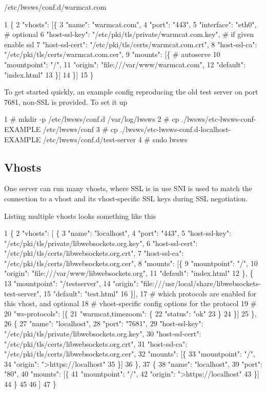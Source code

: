 /etc/lwsws/conf.d/warmcat.\+com 
\begin{DoxyCode}
1 \{
2         "vhosts": [\{
3                 "name": "warmcat.com",
4                 "port": "443",
5                 "interface": "eth0",  # optional
6                 "host-ssl-key": "/etc/pki/tls/private/warmcat.com.key",  # if given enable ssl
7                 "host-ssl-cert": "/etc/pki/tls/certs/warmcat.com.crt",
8                 "host-ssl-ca": "/etc/pki/tls/certs/warmcat.com.cer",
9                 "mounts": [\{  # autoserve
10                         "mountpoint": "/",
11                         "origin": "file:///var/www/warmcat.com",
12                         "default": "index.html"
13                 \}]
14         \}]
15 \}
\end{DoxyCode}
 To get started quickly, an example config reproducing the old test server on port 7681, non-\/\+S\+SL is provided. To set it up 
\begin{DoxyCode}
1 # mkdir -p /etc/lwsws/conf.d /var/log/lwsws
2 # cp ./lwsws/etc-lwsws-conf-EXAMPLE /etc/lwsws/conf
3 # cp ./lwsws/etc-lwsws-conf.d-localhost-EXAMPLE /etc/lwsws/conf.d/test-server
4 # sudo lwsws
\end{DoxyCode}
 \subsection*{Vhosts }

One server can run many vhosts, where S\+SL is in use S\+NI is used to match the connection to a vhost and its vhost-\/specific S\+SL keys during S\+SL negotiation.

Listing multiple vhosts looks something like this 
\begin{DoxyCode}
1 \{
2  "vhosts": [ \{
3      "name": "localhost",
4      "port": "443",
5      "host-ssl-key":  "/etc/pki/tls/private/libwebsockets.org.key",
6      "host-ssl-cert": "/etc/pki/tls/certs/libwebsockets.org.crt",
7      "host-ssl-ca":   "/etc/pki/tls/certs/libwebsockets.org.cer",
8      "mounts": [\{
9        "mountpoint": "/",
10        "origin": "file:///var/www/libwebsockets.org",
11        "default": "index.html"
12        \}, \{
13         "mountpoint": "/testserver",
14         "origin": "file:///usr/local/share/libwebsockets-test-server",
15         "default": "test.html"
16        \}],
17      # which protocols are enabled for this vhost, and optional
18      # vhost-specific config options for the protocol
19      #
20      "ws-protocols": [\{
21        "warmcat,timezoom": \{
22          "status": "ok"
23        \}
24      \}]
25     \},
26     \{
27     "name": "localhost",
28     "port": "7681",
29      "host-ssl-key":  "/etc/pki/tls/private/libwebsockets.org.key",
30      "host-ssl-cert": "/etc/pki/tls/certs/libwebsockets.org.crt",
31      "host-ssl-ca":   "/etc/pki/tls/certs/libwebsockets.org.cer",
32      "mounts": [\{
33        "mountpoint": "/",
34        "origin": ">https://localhost"
35      \}]
36    \},
37     \{
38     "name": "localhost",
39     "port": "80",
40      "mounts": [\{
41        "mountpoint": "/",
42        "origin": ">https://localhost"
43      \}]
44    \}
45 
46   ]
47 \}
\end{DoxyCode}



